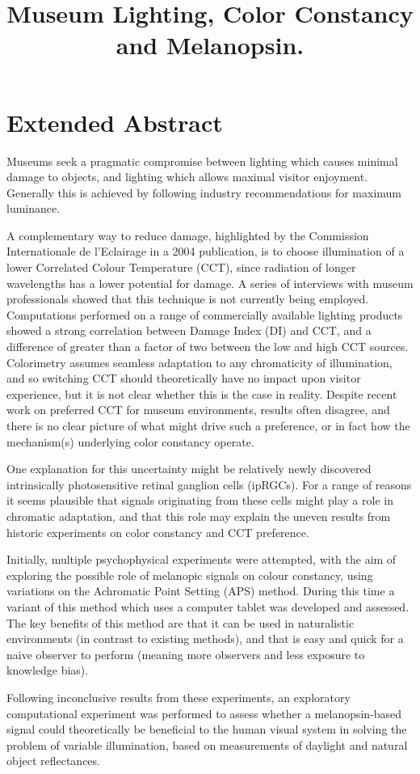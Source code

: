\documentclass{article}
\title{Museum Lighting, Color Constancy and Melanopsin.}
\date{}
\begin{document}
\maketitle

\section{Extended Abstract}

Museums seek a pragmatic compromise between lighting which causes minimal damage to objects, and lighting which allows maximal visitor enjoyment. Generally this is achieved by following industry recommendations for maximum luminance.

A complementary way to reduce damage, highlighted by the Commission Internationale de l'Eclairage in a 2004 publication, is to choose illumination of a lower Correlated Colour Temperature (CCT), since radiation of longer wavelengths has a lower potential for damage. A series of interviews with museum professionals showed that this technique is not currently being employed. Computations performed on a range of commercially available lighting products showed a strong correlation between Damage Index (DI) and CCT, and a difference of greater than a factor of two between the low and high CCT sources. 
Colorimetry assumes seamless adaptation to any chromaticity of illumination, and so switching CCT should theoretically have no impact upon visitor experience, but it is not clear whether this is the case in reality. Despite recent work on preferred CCT for museum environments, results often disagree, and there is no clear picture of what might drive such a preference, or in fact how the mechanism(s) underlying color constancy operate.

One explanation for this uncertainty might be relatively newly discovered intrinsically photosensitive retinal ganglion cells (ipRGCs). For a range of reasons it seems plausible that signals originating from these cells might play a role in chromatic adaptation, and that this role may explain the uneven results from historic experiments on color constancy and CCT preference.

Initially, multiple psychophysical experiments were attempted, with the aim of exploring the possible role of melanopic signals on colour constancy, using variations on the Achromatic Point Setting (APS) method. During this time a variant of this method which uses a computer tablet was developed and assessed. The key benefits of this method are that it can be used in naturalistic environments (in contrast to existing methods), and that is easy and quick for a naive observer to perform (meaning more observers and less exposure to knowledge bias).

Following inconclusive results from these experiments, an exploratory computational experiment was performed to assess whether a melanopsin-based signal could theoretically be beneficial to the human visual system in solving the problem of variable illumination, based on measurements of daylight and natural object reflectances.
\end{document}
